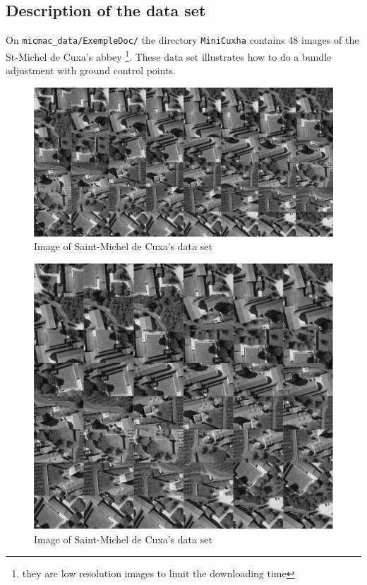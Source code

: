 
\subsection{Description of the data set}
\label{Cuxa:DataSet}

On {\tt micmac\_data/ExempleDoc/} the directory {\tt MiniCuxha} contains
$48$ images of the St-Michel de Cuxa's abbey \footnote{they are low resolution images
to limit the  downloading time}. These data set illustrates how to
do a bundle adjustment with ground control points.

\begin{figure}
\includegraphics[width=120mm]{FIGS/SaintMicheldeCuxa/Planche.jpg}
\caption{Image of Saint-Michel de Cuxa's data set }
\label{FIG:Glob:Cuxa}
\end{figure}

\begin{figure}[H]
\begin{center}
\includegraphics[width=160mm]{FIGS/Cuxa/Planche.jpg}
\caption{Image of Saint-Michel de Cuxa's data set }
\end{center}
\label{FIG:Glob:Cuxa}
\end{figure}

